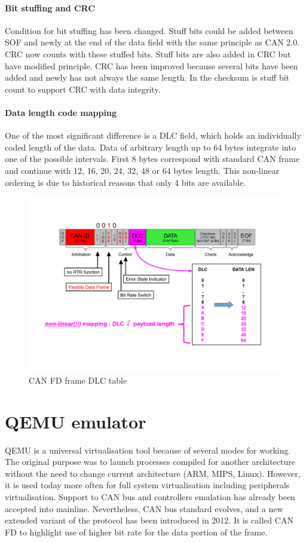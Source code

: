 \documentclass{ctuthesis}
\begin{document}
   \subsubsection{Bit stuffing and CRC}
    Condition for bit stuffing has been changed. Stuff bits could be added between SOF and newly at the end of the data field with the same principle as CAN 2.0. CRC now counts with these stuffed bits. Stuff bits are also added in CRC but have modified principle. CRC has been improved because several bits have been added and newly has not always the same length. In the checksum is stuff bit count to support CRC with data integrity.
   \subsubsection{Data length code mapping}
    One of the most significant difference is a DLC field, which holds an individually coded length of the data. Data of arbitrary length up to 64 bytes integrate into one of the possible intervals. First 8 bytes correspond with standard CAN frame and continue with 12, 16, 20, 24, 32, 48 or 64 bytes length. This non-linear ordering is due to historical reasons that only 4 bits are available.
    \begin{figure}[H]
    \includegraphics[width=1\textwidth]{agl2017-socketcan-can_fd_dlc}
    \caption{CAN FD frame DLC table \cite{canfd_dlc}}
    \end{figure}
 
\chapter{QEMU emulator}
 QEMU is a universal virtualisation tool because of several modes for working. The original purpose was to launch processes compiled for another architecture without the need to change current architecture (ARM, MIPS, Linux). However, it is used today more often for full system virtualisation including peripherals virtualisation. Support to CAN bus and controllers emulation has already been accepted into mainline. Nevertheless, CAN bus standard evolves, and a new extended variant of the protocol has been introduced in 2012. It is called CAN FD to highlight use of higher bit rate for the data portion of the frame.
\end{document}

